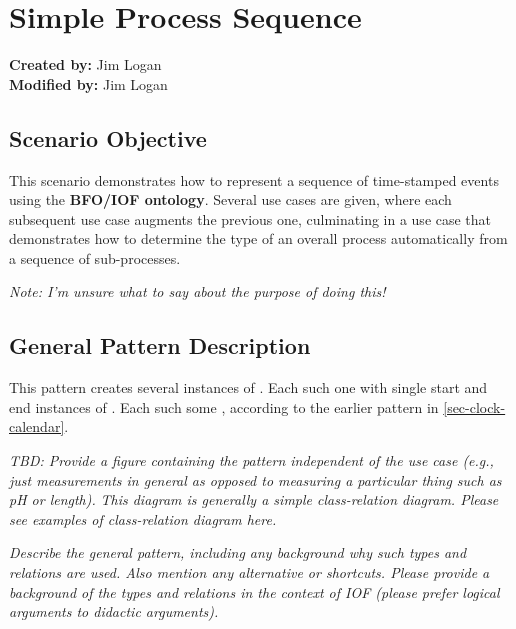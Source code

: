 
\section{Simple Process Sequence}

\textbf{Created by:} Jim Logan \\
\textbf{Modified by:} Jim Logan \\

\subsection*{Scenario Objective}
This scenario demonstrates how to represent a sequence of time-stamped events using the \textbf{BFO/IOF ontology}. Several use cases are given, where each subsequent use case augments the previous one, culminating in a use case that demonstrates how to determine the type of an overall process automatically from a sequence of sub-processes.

\textit{ 
Note: I'm unsure what to say about the purpose of doing this!
}

\subsection*{General Pattern Description}

This pattern creates several instances of . Each such 
one
with single start and end instances of
.
Each such 
 some
, according to the earlier pattern in
\ref{sec-clock-calendar}.

\textit{
TBD: Provide a figure containing the pattern independent of the use case (e.g., just measurements in general as opposed to measuring a particular thing such as pH or length).
}
\noindent \textit{This diagram is generally a simple class-relation diagram. Please see examples of class-relation diagram here.}

\textit{ 
Describe the general pattern, including any background why such types and relations are used. Also mention any alternative or shortcuts. Please provide a background of the types and relations in the context of IOF (please prefer logical arguments to didactic arguments).
}


